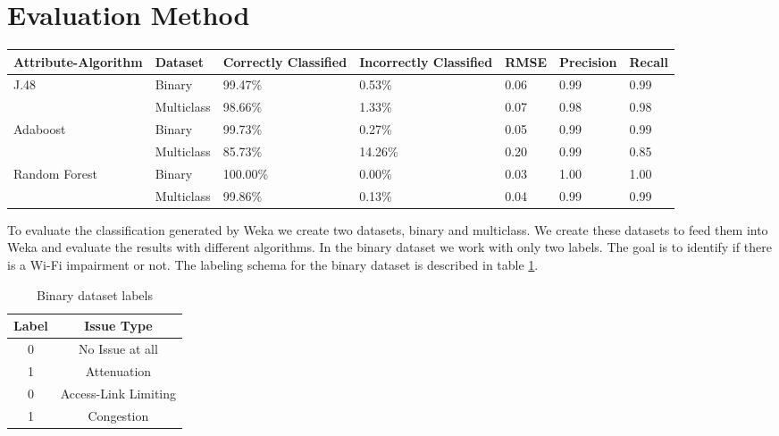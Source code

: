 \section{Evaluation Method}\label{Evaluation_Method}

\begin{table*}[!bp]
	\begin{center}
		\begin{tabular}{|| m{2.5cm} | m{2cm} | m{2cm}| m{2cm} | m{2cm}| m{2cm} | m{2cm}  ||}
			\hline
			Attribute-Algorithm & Dataset & Correctly Classified & Incorrectly Classified & RMSE & Precision & Recall \\ [0.5ex] 
			\hline\hline
			\multirow{2}{*}{J.48} & Binary & 99.47\% & 0.53\% & 0.06 & 0.99 & 0.99 \\
			& Multiclass & 98.66\% & 1.33\% & 0.07 & 0.98 & 0.98 \\
			\multirow{2}{*}{Adaboost} & Binary & 99.73\% & 0.27\% & 0.05 & 0.99 & 0.99 \\
			& Multiclass & 85.73\% & 14.26\% & 0.20 & 0.99 & 0.85 \\
			\multirow{2}{*}{Random Forest} & Binary & 100.00\% & 0.00\% & 0.03 & 1.00 & 1.00 \\
			& Multiclass & 99.86\% & 0.13\% & 0.04 & 0.99 & 0.99 \\
			\hline
		\end{tabular}
		\caption{Classification Results}
		\label{table:classification_results}
	\end{center}
\end{table*}

To evaluate the classification generated by Weka we create two datasets, binary and multiclass. We create these datasets to feed them into Weka and evaluate the results with different algorithms. In the binary dataset we work with only two labels. The goal is to identify if there is a Wi-Fi impairment or not. The labeling schema for the binary dataset is described in table \ref{table:binary_labels}.

\begin{table}[H]
	\begin{center}
		\begin{tabular}{||c c||} 
			\hline
			Label & Issue Type\\ [0.5ex] 
			\hline\hline
			0 & No Issue at all \\ 
			\hline
			1 & Attenuation\\
			\hline
			0 & Access-Link Limiting \\
			\hline
			1 & Congestion \\[1ex] 
			\hline
		\end{tabular}
		\caption{Binary dataset labels}
		\label{table:binary_labels}
	\end{center}
\end{table}

